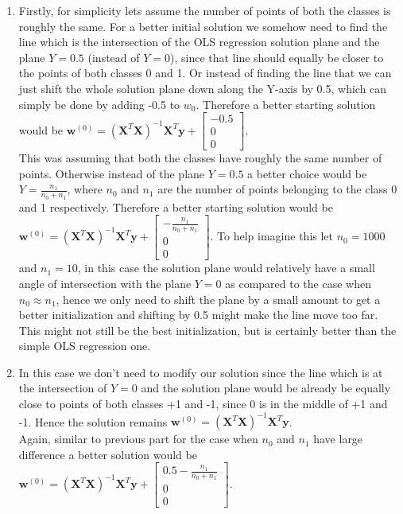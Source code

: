 \documentclass[twoside]{article}
\begin{document}
\begin{enumerate}
	\item
	Firstly, for simplicity lets assume the number of points of both the classes is roughly the same. For a better initial solution we somehow need to find the line which is the intersection of the OLS regression solution plane and the plane $Y=0.5$ (instead of $Y=0$), since that line should equally be closer to the points of both classes 0 and 1. Or instead of finding the line that we can just shift the whole solution plane down along the Y-axis by 0.5, which can simply be done by adding -0.5 to $w_0$. Therefore a better starting solution would be $\mathbf{w}^{(0)}=(\mathbf{X}^{T}\mathbf{X})^{-1}\mathbf{X}^{T}\mathbf{y} + \begin{bmatrix}
	-0.5\\0\\0
	\end{bmatrix}$.\\
	This was assuming that both the classes have roughly the same number of points. Otherwise instead of the plane $Y=0.5$ a better choice would be $Y = \frac{n_1}{n_0+n_1}$, where $n_0$ and $n_1$ are the number of points belonging to the class 0 and 1 respectively. Therefore a better starting solution would be $\mathbf{w}^{(0)}=(\mathbf{X}^{T}\mathbf{X})^{-1}\mathbf{X}^{T}\mathbf{y} + \begin{bmatrix}-\frac{n_1}{n_0+n_1}\\0\\0\end{bmatrix}$. To help imagine this let $n_0=1000$ and $n_1 = 10$, in this case the solution plane would relatively have a small angle of intersection with the plane $Y=0$ as compared to the case when $n_0 \approx n_1$, hence we only need to shift the plane by a small amount to get a better initialization and shifting by 0.5 might make the line move too far. This might not still be the best initialization, but is certainly better than the simple OLS regression one.
	
	\item
	In this case we don't need to modify our solution since the line which is at the intersection of $Y=0$ and the solution plane would be already be equally close to points of both classes +1 and -1, since 0 is in the middle of +1 and -1. Hence the solution remains $\mathbf{w}^{(0)}=(\mathbf{X}^{T}\mathbf{X})^{-1}\mathbf{X}^{T}\mathbf{y}$.\\
	Again, similar to previous part for the case when $n_0$ and $n_1$ have large difference a better solution would be $\mathbf{w}^{(0)}=(\mathbf{X}^{T}\mathbf{X})^{-1}\mathbf{X}^{T}\mathbf{y} + \begin{bmatrix}0.5-\frac{n_1}{n_0+n_1}\\0\\0\end{bmatrix}$.
	
	
\end{enumerate}
\end{document}
